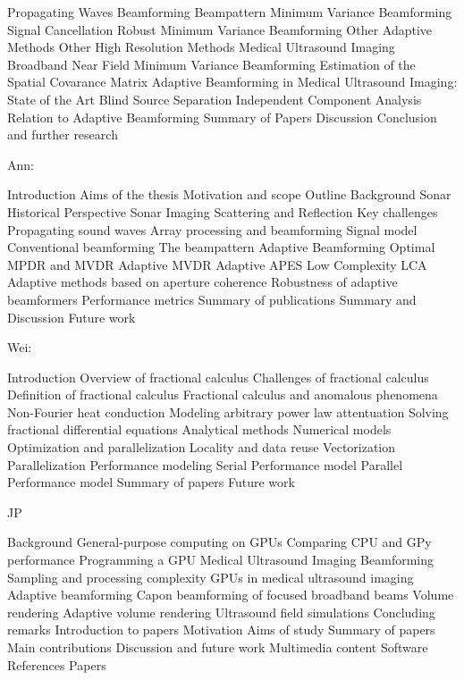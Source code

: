 Propagating Waves
Beamforming
  Beampattern
Minimum Variance Beamforming
  Signal Cancellation
  Robust Minimum Variance Beamforming
  Other Adaptive Methods
  Other High Resolution Methods
Medical Ultrasound Imaging
  Broadband Near Field Minimum Variance Beamforming
  Estimation of the Spatial Covarance Matrix
Adaptive Beamforming in Medical Ultrasound Imaging: State of the Art
Blind Source Separation
  Independent Component Analysis
  Relation to Adaptive Beamforming
Summary  of Papers
Discussion
Conclusion and further research

Ann:

Introduction
   Aims of the thesis
   Motivation and scope
   Outline
Background
   Sonar
      Historical Perspective
      Sonar Imaging
      Scattering and Reflection
      Key challenges
   Propagating sound waves
   Array processing and beamforming
      Signal model
      Conventional beamforming
      The beampattern
   Adaptive Beamforming
      Optimal MPDR and MVDR
      Adaptive MVDR
      Adaptive APES
      Low Complexity LCA
      Adaptive methods based on aperture coherence
      Robustness of adaptive beamformers
   Performance metrics
Summary of publications
Summary and Discussion
Future work

Wei:

Introduction
   Overview of fractional calculus
   Challenges of fractional calculus
   Definition of fractional calculus
   Fractional calculus and anomalous phenomena
      Non-Fourier heat conduction
      Modeling arbitrary power law attentuation
   Solving fractional differential equations
      Analytical methods
      Numerical models
   Optimization and parallelization
      Locality and data reuse
      Vectorization
      Parallelization
   Performance modeling
      Serial Performance model
      Parallel Performance model
Summary of papers
Future work
   
   
JP

Background
   General-purpose computing on GPUs
      Comparing CPU and GPy performance
      Programming a GPU
   Medical Ultrasound Imaging
      Beamforming
      Sampling and processing complexity
      GPUs in medical ultrasound imaging
      Adaptive beamforming
      Capon beamforming of focused broadband beams
   Volume rendering
      Adaptive volume rendering
   Ultrasound field simulations
   Concluding remarks
Introduction to papers
   Motivation
   Aims of study
   Summary of papers
   Main contributions
   Discussion and future work
   Multimedia content
   Software
References
Papers


